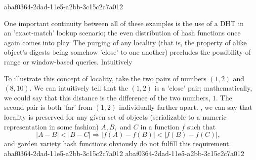 \documentclass[12pt]{article}
\begin{document}
abaf0364-2dad-11e5-a2bb-3c15c2c7a012\par One important continuity between all of these examples is the use of a DHT in an 'exact-match' lookup scenario; the even distribution of hash functions once again comes into play. The purging of any locality (that is, the property of alike object's digests being somehow 'close' to one another) precludes the possibility of range or window-based queries. Intuitively

\par To illustrate this concept of locality, take the two pairs of numbers $(1,2)$ and $(8,10)$. We can intuitively tell that the $(1,2)$ is a 'close' pair; mathematically, we could say that this distance is the difference of the two numbers, $1$. The second pair is both 'far' from $(1,2)$ individually farther apart. , we can say that locality is preserved for any given set of objects (serializable to a numeric representation in some fashion) $A,B,$ and $C$ in a function $f$ such that
\begin{equation}
|A-B| < |B-C| \Rightarrow |f(A)-f(B)| < |f(B) - f(C)|,
\end{equation}
and garden variety hash functions obviously do not fulfill this requirement.
abaf0364-2dad-11e5-a2bb-3c15c2c7a012
abaf0364-2dad-11e5-a2bb-3c15c2c7a012\printbibliography
\end{document}
